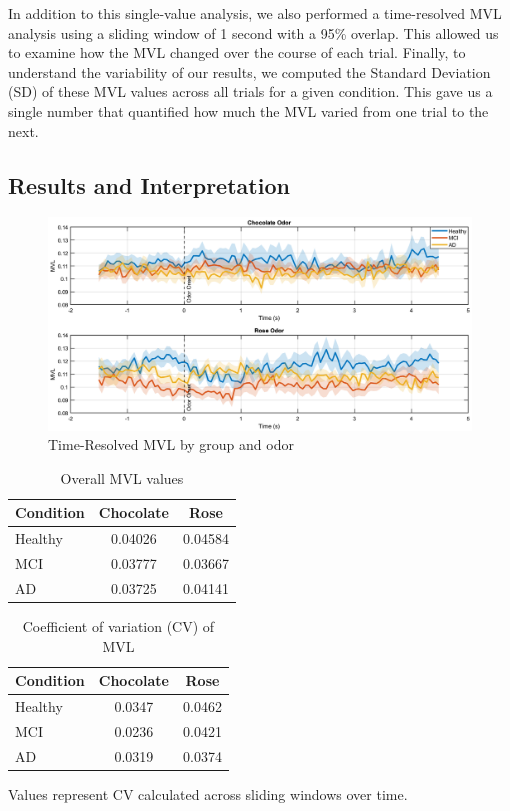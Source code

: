 \documentclass[hidelinks,12pt]{article}
\begin{document}
	In addition to this single-value analysis, we also performed a time-resolved MVL analysis using a sliding window of 1 second with a 95\% overlap. This allowed us to examine how the MVL changed over the course of each trial.
	\bigbreak
	Finally, to understand the variability of our results, we computed the Standard Deviation (SD) of these MVL values across all trials for a given condition. This gave us a single number that quantified how much the MVL varied from one trial to the next.
	
	
	\subsection{Results and Interpretation}
	
	
	\begin{figure}[h!]
		\centering
		\includegraphics[width=\textwidth]{10}
		\caption{Time-Resolved MVL by group and odor}
	\end{figure}
	
	\newpage
	
	\begin{table}[h!]
		\centering
		\begin{tabular}{lcc}
			\hline
			\textbf{Condition} & \textbf{Chocolate} & \textbf{Rose} \\
			\hline
			Healthy & 0.04026 & 0.04584 \\
			MCI     & 0.03777 & 0.03667 \\
			AD      & 0.03725 & 0.04141 \\
			\hline
		\end{tabular}
		\caption{Overall MVL values}
		\label{table:1}
	\end{table}
	
	\begin{table}[h!]
		\centering
		\begin{tabular}{lcc}
			\hline
			\textbf{Condition} & \textbf{Chocolate} & \textbf{Rose} \\
			\hline
			Healthy & 0.0347 & 0.0462 \\
			MCI     & 0.0236 & 0.0421 \\
			AD      & 0.0319 & 0.0374 \\
			\hline
		\end{tabular}
		\caption{Coefficient of variation (CV) of MVL}
		\tiny{Values represent CV calculated across sliding windows over time.}
		\label{table:2}
	\end{table}
	
\end{document}
